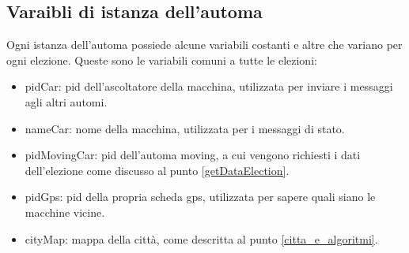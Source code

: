 \subsection{Varaibli di istanza dell'automa} \label{stato_elezione_automa}
Ogni istanza dell'automa possiede alcune variabili costanti e altre che variano per ogni elezione. Queste sono le variabili comuni a tutte le elezioni:
\begin{itemize}
	\item pidCar: pid dell'ascoltatore della macchina, utilizzata per inviare i messaggi agli altri automi.
	\item nameCar: nome della macchina, utilizzata per i messaggi di stato.
	\item pidMovingCar: pid dell'automa moving, a cui vengono richiesti i dati dell'elezione come discusso al punto \ref{getDataElection}.
	\item pidGps: pid della propria scheda gps, utilizzata per sapere quali siano le macchine vicine.
	\item cityMap: mappa della città, come descritta al punto \ref{citta_e_algoritmi}.
\end{itemize}

